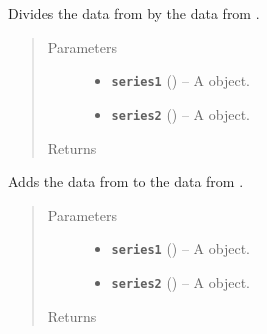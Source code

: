 \documentclass[letterpaper,10pt,english]{sphinxmanual}
\begin{document}

\begin{fulllineitems}
\label{additional_functions:fredpy.divide}
Divides the data from  by the data from .
\begin{quote}\begin{description}
\item[{Parameters}] \leavevmode\begin{itemize}
\item {} 
\textbf{\texttt{series1}} ({\hyperref[series_class:fredpy.series]{}}) -- A  object.

\item {} 
\textbf{\texttt{series2}} ({\hyperref[series_class:fredpy.series]{}}) -- A  object.

\end{itemize}

\item[{Returns}] \leavevmode
{\hyperref[series_class:fredpy.series]{}}

\end{description}\end{quote}

\end{fulllineitems}


\begin{fulllineitems}
\label{additional_functions:fredpy.plus}
Adds the data from  to the data from .
\begin{quote}\begin{description}
\item[{Parameters}] \leavevmode\begin{itemize}
\item {} 
\textbf{\texttt{series1}} ({\hyperref[series_class:fredpy.series]{}}) -- A  object.

\item {} 
\textbf{\texttt{series2}} ({\hyperref[series_class:fredpy.series]{}}) -- A  object.

\end{itemize}

\item[{Returns}] \leavevmode
{\hyperref[series_class:fredpy.series]{}}

\end{description}\end{quote}

\end{fulllineitems}
\end{document}
